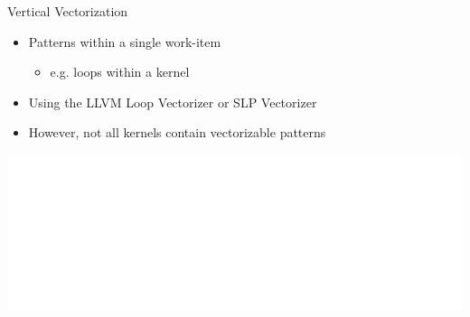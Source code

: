 
\begin{frame}{Vertical Vectorization}

\begin{itemize}
    \item Patterns within a single work-item
    \begin{itemize}
        \item e.g. loops within a kernel
    \end{itemize}
    \item Using the LLVM Loop Vectorizer or SLP Vectorizer
    \item However, not all kernels contain vectorizable patterns
\end{itemize}

\vspace{5ex}
\hspace{1em}\includegraphics[scale=0.40]{images/vertical-vectorization.pdf}

\end{frame}


